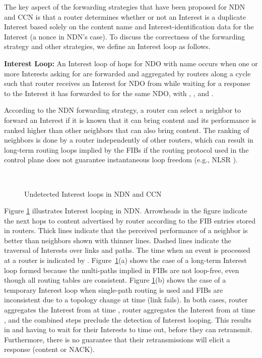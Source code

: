 \documentclass{ancs15-alternate}
\begin{document}
The key aspect of the  forwarding strategies that have been proposed  for NDN and CCN is that  a router determines whether or not an Interest is  a duplicate Interest  based solely on the content name and Interest-identification data for the Interest (a nonce in NDN's case).  To discuss  the correctness of the  forwarding strategy and other strategies,  we define an Interest loop as follows.

\vspace{0.1in}
{\bf  Interest Loop:}  
An Interest loop of  hops for NDO with name   occurs  when one or more Interests asking for  are forwarded and aggregated by routers along a cycle    
such that router  receives an Interest for NDO  from  while waiting for a response to the Interest it has forwarded to  for the same NDO, with , , and . 

\vspace{0.1in}
According to the NDN forwarding strategy, a router can select a  neighbor 
to forward an Interest if it is known that it can bring content 
and its performance is ranked higher than other neighbors that can also bring content. The ranking of  neighbors  is done by a router independently of other routers, which can result in long-term routing loops implied by the FIBs if the routing protocol used in the control plane does not guarantee instantaneous loop freedom (e.g., NLSR \cite{nlsr}). 


\vspace{-0.15in}
\begin{figure}[h]
\begin{centering}
    \mbox{
      }
\vspace{-0.15in}
   \caption{Undetected Interest loops in NDN and CCN
   }
   \label{ndn-loop}
\end{centering} 
\end{figure}  


Figure \ref{ndn-loop}  illustrates Interest looping in NDN. 
Arrowheads in the figure indicate the next hops to content advertised by router   according to the FIB entries stored in routers.  Thick lines indicate that the perceived performance of a neighbor is 
better than neighbors shown with thinner lines.   Dashed lines indicate the traversal of Interests over links and paths. The time when an event is processed at a router is indicated by .
Figure~\ref{ndn-loop}(a) shows the case of a long-term Interest loop formed because the  multi-paths implied in FIBs are not loop-free, even though all routing tables are consistent. 
Figure \ref{ndn-loop}(b) shows the case of a temporary Interest loop when single-path routing is used and FIBs are inconsistent due to a topology change at time  (link  fails). In both cases, router  aggregates  the Interest from  at time ,  router  aggregates the Interest from  at time , and the combined steps preclude the detection of Interest looping. This results in  and  having to wait for their Interests to time out, before they can retransmit. Furthermore, there is no guarantee that their retransmissions will elicit a response (content or NACK).
 
\end{document}
